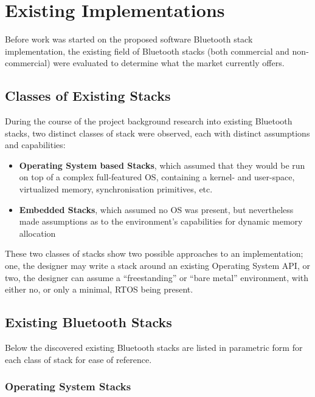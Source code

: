 \chapter{Existing Implementations}
\label{chp:existingimp}

Before work was started on the proposed software Bluetooth stack implementation, the existing field of Bluetooth stacks (both commercial and non-commercial) were evaluated to determine what the market currently offers.

\section{Classes of Existing Stacks}

During the course of the project background research into existing Bluetooth stacks, two distinct classes of stack were observed, each with distinct assumptions and capabilities:

\begin{itemize}
	\item \textbf{Operating System based Stacks}, which assumed that they would be run on top of a complex full-featured OS, containing a kernel- and user-space, virtualized memory, synchronisation primitives, etc.
	\item \textbf{Embedded Stacks}, which assumed no OS was present, but nevertheless made assumptions as to the environment's capabilities for dynamic memory allocation
\end{itemize}

These two classes of stacks show two possible approaches to an implementation; one, the designer may write a stack around an existing Operating System API, or two, the designer can assume a ``freestanding'' or ``bare metal'' environment, with either no, or only a minimal, RTOS being present.

\section{Existing Bluetooth Stacks}

Below the discovered existing Bluetooth stacks are listed in parametric form for each class of stack for ease of reference.

\subsection{Operating System Stacks}

